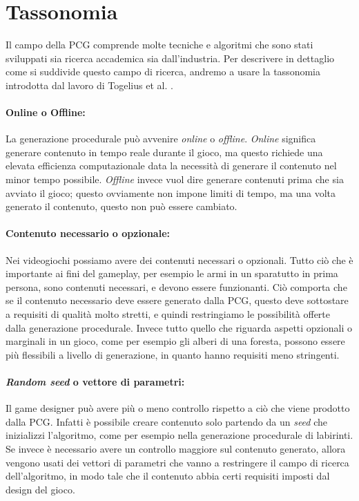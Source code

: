 \documentclass[12pt, italian]{toptesi}
\begin{document}
\section{Tassonomia}

Il campo della PCG comprende molte tecniche e algoritmi che sono stati sviluppati sia ricerca accademica sia dall'industria.
Per descrivere in dettaglio come si suddivide questo campo di ricerca, andremo a usare la tassonomia introdotta dal lavoro
di Togelius et al. \cite{taxonomy:article}.

\paragraph{Online o Offline:}
La generazione procedurale può avvenire \emph{online} o \emph{offline}.
\emph{Online} significa generare contenuto in tempo reale durante il gioco, ma questo richiede una elevata efficienza computazionale data la necessità di generare il contenuto nel minor tempo possibile.
\emph{Offline} invece vuol dire generare contenuti prima che sia avviato il gioco; questo ovviamente non impone limiti di tempo, ma una volta generato il contenuto, questo non può essere cambiato.
 
\paragraph{Contenuto necessario o opzionale:}
Nei videogiochi possiamo avere dei contenuti necessari o opzionali.
Tutto ciò che è importante ai fini del gameplay, per esempio le armi in un sparatutto in prima persona, 
sono contenuti necessari, e devono essere funzionanti. Ciò comporta che se il contenuto necessario deve essere 
generato dalla PCG, questo deve sottostare a requisiti di qualità molto stretti, e quindi restringiamo le possibilità offerte dalla generazione procedurale.
Invece tutto quello che riguarda aspetti opzionali o marginali in un gioco, come per esempio gli alberi di una foresta,
possono essere più flessibili a livello di generazione, in quanto hanno requisiti meno stringenti.
 
\paragraph{\emph{Random seed} o vettore di parametri:}
Il game designer può avere più o meno controllo rispetto a ciò che viene prodotto dalla PCG.
Infatti è possibile creare contenuto solo partendo da un \emph{seed} che inizializzi l'algoritmo,
come per esempio nella generazione procedurale di labirinti.
Se invece è necessario avere un controllo maggiore sul contenuto generato,
allora vengono usati dei vettori di parametri che vanno a restringere il campo di ricerca dell'algoritmo,
in modo tale che il contenuto abbia certi requisiti imposti dal design del gioco.
 
\end{document}
